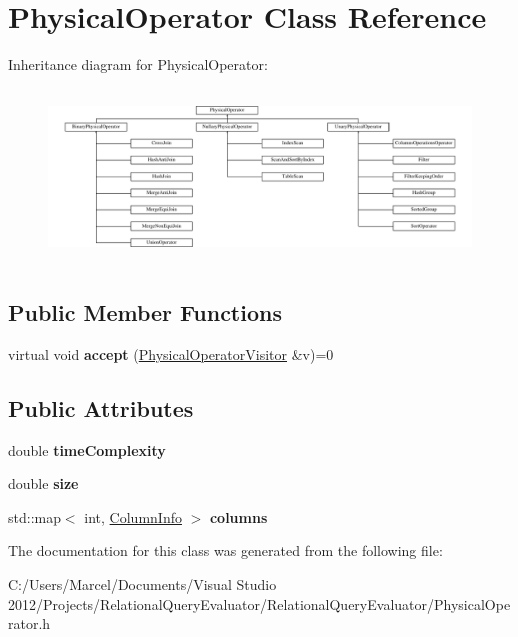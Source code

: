 \hypertarget{class_physical_operator}{\section{Physical\+Operator Class Reference}
\label{class_physical_operator}
}
Inheritance diagram for Physical\+Operator\+:\begin{figure}[H]
\begin{center}
\leavevmode
\includegraphics[height=4.640884cm]{class_physical_operator}
\end{center}
\end{figure}
\subsection*{Public Member Functions}
\begin{DoxyCompactItemize}
\item 
\hypertarget{class_physical_operator_aec6926a904c71c0619d6e9e1457252cd}{virtual void {\bfseries accept} (\hyperlink{class_physical_operator_visitor}{Physical\+Operator\+Visitor} \&v)=0}\label{class_physical_operator_aec6926a904c71c0619d6e9e1457252cd}

\end{DoxyCompactItemize}
\subsection*{Public Attributes}
\begin{DoxyCompactItemize}
\item 
\hypertarget{class_physical_operator_a88836a2b6453889b6ad852a2121ca512}{double {\bfseries time\+Complexity}}\label{class_physical_operator_a88836a2b6453889b6ad852a2121ca512}

\item 
\hypertarget{class_physical_operator_a744971579c457601553e8e9a70a5cee1}{double {\bfseries size}}\label{class_physical_operator_a744971579c457601553e8e9a70a5cee1}

\item 
\hypertarget{class_physical_operator_aaf7e49cbadd48e7b0b30e9a84367e5de}{std\+::map$<$ int, \hyperlink{class_column_info}{Column\+Info} $>$ {\bfseries columns}}\label{class_physical_operator_aaf7e49cbadd48e7b0b30e9a84367e5de}

\end{DoxyCompactItemize}


The documentation for this class was generated from the following file\+:\begin{DoxyCompactItemize}
\item 
C\+:/\+Users/\+Marcel/\+Documents/\+Visual Studio 2012/\+Projects/\+Relational\+Query\+Evaluator/\+Relational\+Query\+Evaluator/Physical\+Operator.\+h\end{DoxyCompactItemize}
